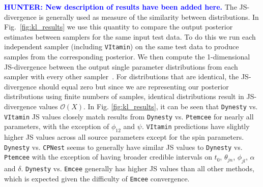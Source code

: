 \documentclass[%
showpacs,
nofootinbib,
 amsmath,amssymb,
 aps,
 twocolumn,
 prl,
 reprint,
floatfix,
]{revtex4-1}
\newcommand{\hunter}[1]{\textbf{\textcolor{blue}{HUNTER: #1}}}
\begin{document}
%
%
\hunter{New description of results have been added here.}
The \ac{JS}-divergence is generally used as measure of the similarity 
between distributions.  In Fig.~\ref{fig:kl_results} 
we use this quantity to compare the output posterior estimates between 
samplers for the same input test data. To do this we run each independent 
sampler (including \texttt{VItamin}) on the same test data to produce 
samples from the corresponding posterior. We then compute the 
1-dimensional \ac{JS}-divergence between the output single 
parameter distributions from each sampler with every 
other sampler~\cite{4839047}. For distributions that are 
identical, the \ac{JS}-divergence {should} equal zero but since we 
are representing our posterior distributions using finite numbers of 
samples, identical distributions result in \ac{JS}-divergence values
$\mathcal{O}(X)$.  
In Fig. \ref{fig:kl_results}, it can be seen that \texttt{Dynesty}  
vs. \texttt{VItamin} JS values closely match results from 
\texttt{Dynesty} vs. \texttt{Ptemcee} for nearly all parameters, with 
the exception of $\phi_{12}$ and $\psi$. \texttt{VItamin} predictions have slightly 
higher \ac{JS} values across all source parameters except for the 
spin parameters. \texttt{Dynesty} vs. \texttt{CPNest} seems to generally 
have similar \ac{JS} values to \texttt{Dynesty} vs. \texttt{Ptemcee} with 
the exception of having broader credible intervals on $t_0$, 
$\theta_{jn}$, $\phi_{jl}$, $\alpha$ and $\delta$. 
\texttt{Dynesty} vs. \texttt{Emcee} generally has higher JS values than 
all other methods, which is expected given the difficulty of 
\texttt{Emcee} convergence.
  


\end{document}
